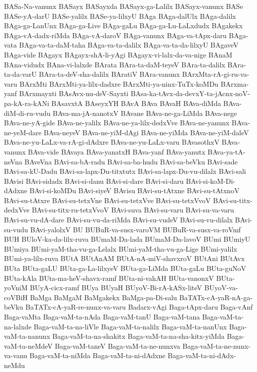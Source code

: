 {BASa-Na-vanunx
BASayx
BASayxda
BASayx-ga-Lalilx
BASayx-vanunx
BASe
BASe-yA-darU
BASe-yalilx
BASe-ya-lilxyU
BAga
BAga-dalUlx
BAga-dalilx
BAga-ga-LanUnx
BAga-ga-Live
BAga-gaLu
BAga-ga-Lu-LaLxdudx
BAgakekx
BAga-vA-dadx-riMda
BAga-vA-daroV
BAga-vanunx
BAga-va-tApx-daru
BAga-vata
BAga-va-ta-daM-taha
BAga-va-ta-dalilx
BAga-va-ta-da-lilxyU
BAgaveV
BAga-vide
BAgayx
BAgayx-shA-li-yAgi
BAgayx-vi-lalx-da-va-nige
BAnaM
BAna-vidudx
BAna-vi-lalxde
BArata
BAra-ta-daM-teyeV
BAra-ta-dalilx
BAra-ta-da-varU
BAra-ta-deV-sha-dalilx
BAratiV
BAra-vanunx
BArxMta-rA-gi-ru-va-varu
BArxMti
BArxMti-ya-lilx-dadxre
BArxMti-ya-ninx-TuTx-koMDu
BArxma-yanf
BArxmayxti
BAsAvx-nu-deV-Sayxti
BAsa-ka-tAvx-da-devxY-ta-jAcnx-noV-pa-kA-ra-kANi
BAsavxtA
BAseyxYH
BAvA
BAva
BAvaH
BAva-diMda
BAva-diM-di-ru-vudu
BAva-ma-jA-nanotxV
BAvane
BAva-ne-ga-LiMda
BAva-nege
BAva-ne-yA-gide
BAva-ne-yalilx
BAva-ne-ya-lilx-dedxVve
BAva-ne-yanunx
BAva-ne-yeM-dare
BAva-neyeV
BAva-ne-yiM-dAgi
BAva-ne-yiMda
BAva-ne-yiM-daleV
BAva-ne-yu-LaLx-va-rA-gi-dAdxre
BAva-ne-yu-LaLx-varu
BAvasothxV
BAva-vanunx
BAva-vide
BAvaya
BAva-yanatxH
BAva-yanf
BAva-yanutx
BAva-ya-tA-neVna
BAveVna
BAvi-sa-bA-radu
BAvi-sa-ba-hudu
BAvi-sa-beVku
BAvi-sade
BAvi-sa-kU-Dadu
BAvi-sa-lapx-Du-titxtutx
BAvi-sa-lapx-Du-vu-dilalx
BAvi-sali
BAvisi
BAvi-sidadx
BAvi-si-danu
BAvi-si-dare
BAvi-si-daru
BAvi-si-koM-Di-dAdxne
BAvi-si-koMDu
BAvi-siyeV
BAvisu
BAvi-su-tAtxne
BAvi-su-tAtxnoV
BAvi-su-tAtxre
BAvi-su-tetxVne
BAvi-su-tetxVve
BAvi-su-tetxVvoV
BAvi-su-titx-dedxVve
BAvi-su-titx-ru-tetxVvoV
BAvi-suva
BAvi-su-varu
BAvi-su-va-varu
BAvi-su-vu-dA-dare
BAvi-su-vu-da-riMda
BAvi-su-vudeV
BAvi-su-vu-dilalx
BAvi-su-vudu
BAvi-yalolxV
BU
BUBuR-va-susx-varoVM
BUBuR-va-susx-va-roVmf
BUH
BUloV-ka-da-lilx-ruva
BUmaM-Da-lada
BUmaM-Da-lavoV
BUmi
BUmiyU
BUmiya
BUmi-yaM-tha-vu-ga-Lelalx
BUmi-yaM-tha-vu-ga-Lige
BUmi-yalilx
BUmi-ya-lilx-ruva
BUtA
BUtAnAM
BUtA-nA-miV-shavxroV
BUtAni
BUtAvx
BUta
BUta-gaLU
BUta-ga-La-lilxyeV
BUta-ga-LiMda
BUta-gaLu
BUta-guNoV
BUta-kAla
BUta-ma-heV-shavx-ramf
BUta-ni-vahAH
BUta-vanonxV
BUta-yoVniM
BUyA-cicx-ramf
BUya
BUyaH
BUyoV-Bi-rA-kASx-liteV
BUyoV-va-coVBiH
BaMga
BaMgaM
BaMgakekx
BaMga-pa-Di-salu
BaTATx-cA-yaR-nA-ga-beVku
BaTATx-cA-yaR-re-nunx-va-varu
Badarx-vAgi
Baga-tApx-daru
Baga-vAnf
Baga-vaMta
Baga-vaM-ta-nAda
Baga-vaM-tanU
Baga-vaM-tana
Baga-vaM-ta-na-lalxde
Baga-vaM-ta-na-liVle
Baga-vaM-ta-nalilx
Baga-vaM-ta-nanUnx
Baga-vaM-ta-nanunx
Baga-vaM-ta-na-shakitx
Baga-vaM-ta-na-sha-kitx-yiMda
Baga-vaM-ta-neMdeV
Baga-vaM-taneV
Baga-vaM-ta-ne-nunxva
Baga-vaM-ta-ne-nunx-va-vanu
Baga-vaM-ta-niMda
Baga-vaM-ta-ni-dAdxne
Baga-vaM-ta-ni-dAdx-neMdu
}

